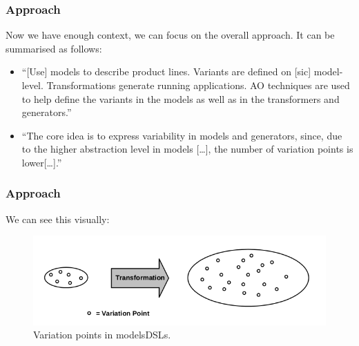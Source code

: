\documentclass{beamer}
\begin{document}
\begin{frame}
\frametitle{Approach}

Now we have enough context, we can focus on the overall approach. It
can be summarised as follows:

\pause

\begin{itemize}

\item ``[Use] models to describe product lines. Variants are defined
  on [sic] model-level.  Transformations generate running
  applications. \acf{AO} techniques are used to help define the
  variants in the models as well as in the transformers and
  generators.''\cite{voelter2007handling}

  \pause

\item ``The core idea is to express variability in models and
  generators, since, due to the higher abstraction level in models
  [\ldots], the number of variation points is
  lower[\ldots].''\cite{voelter2007handling}

\end{itemize}

\end{frame}

\begin{frame}
\frametitle{Approach}

We can see this visually:

\begin{figure}
  \centering
  \includegraphics[scale=0.5]{images/variation_point_voelter.png}
  \caption{Variation points in
    models\ac{DSL}s.\cite{voelter2007handling}}
\end{figure}

\end{frame}
\end{document}
